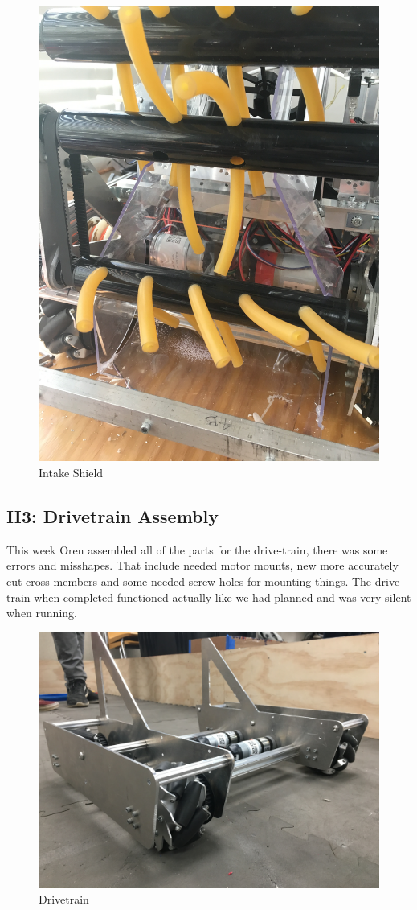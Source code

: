 \documentclass{article}
\begin{document}
\begin{figure}
    \centering
    \includegraphics[width=.6\textwidth, angle=270]{10_11-05/images/intake_shield.JPG}
    \caption{Intake Shield}
    \label{fig:Intake Shield}
\end{figure}

\subsection{H3: Drivetrain Assembly}

This week Oren assembled all of the parts for the drive-train, there was some errors and misshapes. That include needed motor mounts, new more accurately cut cross members and some needed   screw holes for mounting things. The drive-train when completed functioned actually like we had planned and was very silent when running.    

\begin{figure}
    \centering
    \includegraphics[width=.6 \textwidth]{10_11-05/images/drivetrain.JPG}
    \caption{Drivetrain}
    \label{fig:drivetrain}
\end{figure}
\end{document}
